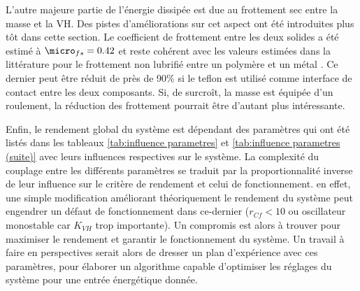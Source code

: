 L'autre majeure partie de l'énergie dissipée est due au frottement sec entre la masse et la VH. Des pistes d'améliorations sur cet aspect ont été introduites plus tôt dans cette section. Le coefficient de frottement entre les deux solides a été estimé à $\micro_{fs}=0.42$ et reste cohérent avec les valeurs estimées dans la littérature pour le frottement non lubrifié entre un polymère et un métal \cite{Nosonovsky2013}. Ce dernier peut être réduit de près de 90\% si le teflon est utilisé comme interface de contact entre les deux composants\cite{Nosonovsky2013}. Si, de surcroît, la masse est équipée d'un roulement, la réduction des frottement pourrait être d'autant plus intéressante.

Enfin, le rendement global du système est dépendant des paramètres qui ont été listés dans les tableaux \ref{tab:influence parametres} et \ref{tab:influence parametres (suite)} avec leurs influences respectives sur le système. La complexité du couplage entre les différents paramètres se traduit par la proportionnalité inverse de leur influence sur le critère de rendement et celui de fonctionnement. en effet, une simple modification améliorant théoriquement le rendement du système peut engendrer un défaut de fonctionnement dans ce-dernier ($r_{Cf}<10$ ou oscillateur monostable car $K_{VH}$ trop importante).  Un compromis est alors à trouver pour maximiser le rendement et garantir le fonctionnement du système. Un travail à faire en perspectives serait alors de dresser un plan d'expérience avec ces paramètres, pour élaborer un algorithme capable d'optimiser les réglages du système pour une entrée énergétique donnée.






